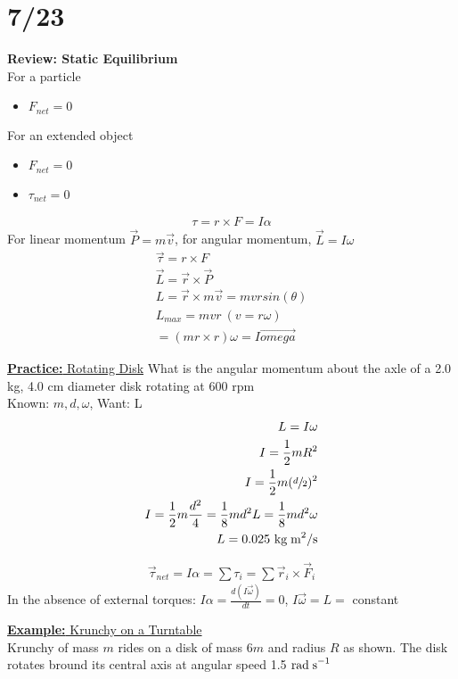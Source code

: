 \documentclass[a4paper]{article}
\let\bf\textbf
\newcommand\rads{\text{ rad\;s}^{-1}}
\newcommand\kgmm{\text{ kg\;m}^{2}}
\begin{document}
\section{7/23}
\bf{Review: Static Equilibrium}\\
For a particle
\begin{itemize}
    \item $F_{net} = 0$
\end{itemize}
For an extended object
\begin{itemize}
    \item $F_{net} = 0$
    \item $\tau_{net} = 0$
\end{itemize}
\begin{align*}
    \tau = r\times F = I\alpha
\end{align*}
For linear momentum $\vec{P} = m\vec{v}$, for angular momentum, $\vec{L} = I\omega$
\begin{align*}
    \vec{\tau} = r\times F\\
    \vec{L} = \vec{r} \times \vec{P}\\
    L = \vec{r}\times m\vec{v} = mvrsin(\theta)\\
    L_{max} = mvr\ (v = r\omega)\\
    = (mr\times r)\omega = I\vec{omega}
\end{align*}
\begin{shaded}
    \underline{\bf{Practice:} Rotating Disk}
    What is the angular momentum about the axle of a 2.0 kg, 4.0 cm diameter disk rotating at 600 rpm\\
    Known: $m, d, \omega$, Want: L
    \begin{align*}
        L = I\omega\\
        I = \frac{1}{2}mR^2\\
        I = \frac{1}{2}m(\sfrac{d}{2})^2\\
        I = \frac{1}{2}m\frac{d^2}{4} = \frac{1}{8}md^2
        L = \frac{1}{8}md^2\omega\\
        L = 0.025\kgmm\text{/s}
    \end{align*}
\end{shaded}
\begin{align*}
    \vec{\tau}_{net} = I\alpha = \sum\tau_i = \sum\vec{r}_i\times \vec{F}_i
\end{align*}
In the absence of external torques: $\displaystyle I\alpha = \frac{d(I\vec{\omega})}{dt} = 0$, $I\vec{\omega} = L =$ constant

\begin{shaded}
    \underline{\bf{Example:} Krunchy on a Turntable}
    \vspace{2mm}\\
    Krunchy of mass $m$ rides on a disk of mass $6m$ and radius $R$ as shown. The disk rotates bround its central axis at angular speed 1.5$\rads$
\end{shaded}
\newpage
\end{document}
